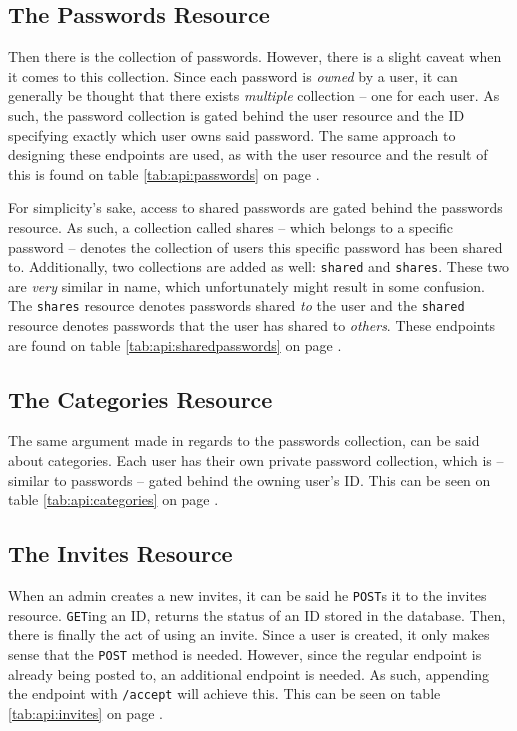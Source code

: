 		\subsection{The Passwords Resource}
			Then there is the collection of passwords. However, there is a slight caveat when it comes to this collection. Since each password is \emph{owned} by a user, it can generally be thought that there exists \emph{multiple} collection -- one for each user. As such, the password collection is gated behind the user resource and the ID specifying exactly which user owns said password. The same approach to designing these endpoints are used, as with the user resource and the result of this is found on table \ref{tab:api:passwords} on page \pageref{tab:api:passwords}.

			For simplicity's sake, access to shared passwords are gated behind the passwords resource. As such, a collection called shares -- which belongs to a specific password -- denotes the collection of users this specific password has been shared to. Additionally, two collections are added as well: \verb=shared= and \verb=shares=. These two are  \emph{very} similar in name, which unfortunately might result in some confusion. The \verb=shares= resource denotes passwords shared \emph{to} the user and the \verb=shared= resource denotes passwords that the user has shared to \emph{others}. These endpoints are found on table \ref{tab:api:sharedpasswords} on page \pageref{tab:api:sharedpasswords}.

		\subsection{The Categories Resource}
			The same argument made in regards to the passwords collection, can be said about categories. Each user has their own private password collection, which is -- similar to passwords -- gated behind the owning user's ID. This can be seen on table \ref{tab:api:categories} on page \pageref{tab:api:categories}.

		\subsection{The Invites Resource}
			When an admin creates a new invites, it can be said he \verb=POST=s it to the invites resource. \verb=GET=ing an ID, returns the status of an ID stored in the database. Then, there is finally the act of using an invite. Since a user is created, it only makes sense that the \verb=POST= method is needed. However, since the regular endpoint is already being posted to, an additional endpoint is needed. As such, appending the endpoint with \verb=/accept= will achieve this. This can be seen on table \ref{tab:api:invites} on page \pageref{tab:api:invites}.

